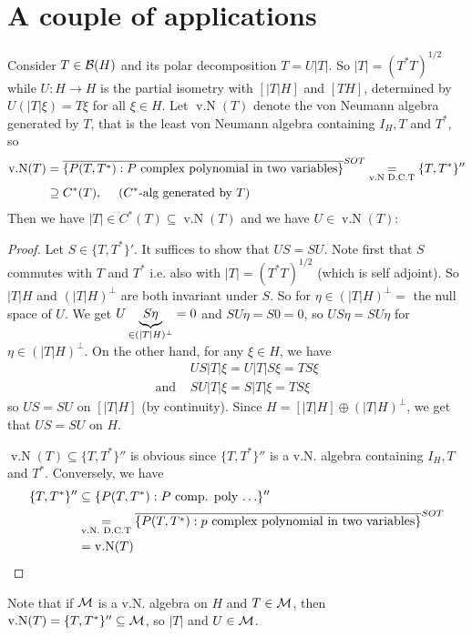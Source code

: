 \documentclass[10pt,english,a4paper]{article}
\theoremstyle{definition}
\let\emph\relax %
\DeclareMathOperator{\vN}{v.N}
\begin{document}
\section{A couple of applications}
Consider $T \in \mathcal{B}(H)$ and its polar decomposition $T = U|T|$. So 
$|T| = (T^*T)^{1/2}$ while $U\colon H\to H$ is the partial isometry 
with \emph{initial space} $[|T|H]$ and \emph{final space} $[TH]$, determined
by $U(|T|\xi) = T\xi$ for all $\xi \in H$.
Let $\vN(T)$ denote the von Neumann algebra generated by $T$, 
that is the least von Neumann algebra containing $I_H, T$ and $T^*$,
so 
\begin{align*}
 \vN(T) &= \ol{\{P(T,T^*): P \text{ complex polynomial in two variables}\}}^{SOT} 
\underset{\text{v.N D.C.T}}{=} \{T,T^*\}''  \\
&\supseteq C^*(T),\quad \text{ ($C^*$-alg generated by $T$)}
\end{align*}
Then we have $|T| \in C^*(T)\subseteq \vN(T)$ 
and we have $U \in \vN(T)$:
\begin{proof}
    Let $S \in \{T,T^*\}'$. It suffices to show that $US=SU$.
Note first that $S$ commutes with $T$ and $T^*$ i.e. also with 
$|T| = (T^*T)^{1/2}$ (which is self adjoint).
So $|T|H$ and $(|T|H)^{\perp}$ are both invariant 
under $S$. So for $\eta \in (|T|H)^{\perp}=$ the null space of $U$.
We get $U\underbrace{S\eta}_{\in(|T|H)^{\perp}} = 0$ and 
$SU\eta = S0 = 0$, so $US\eta = SU\eta$ for $\eta \in (|T|H)^{\perp}$.
On the other hand, for any $\xi \in H$, we have 
\begin{align*}
&US|T|\xi = U|T|S\xi = TS\xi \\
\text{and }&     
SU|T|\xi = S|T|\xi = TS\xi 
\end{align*}
so $US=SU$ on $[|T|H]$ (by continuity). 
Since $H = [|T|H] \oplus (|T|H)^{\perp}$, we get that 
$US=SU$ on $H$.

$\vN(T)\subseteq \{T,T^*\}''$ is obvious since
$\{T,T^*\}''$ is a v.N. algebra containing $I_H, T$ and $T^*$.
Conversely, we have
\begin{align*}
\{T,T^*\}'' &\subseteq \{ P(T,T^*) : P\text{ comp. poly $\ldots$}\}'' \\
&\underset{\text{v.N. D.C.T}}{=}  
\ol{\{P(T,T^*): p \text{ complex polynomial in two variables}\}}^{SOT} \\
&= \vN(T)
\end{align*}
\end{proof}

Note that if $\mathcal{M}$ is a v.N. algebra on $H$ and $T \in \mathcal{M}$, then 
$\vN(T) = \{T,T^*\}'' \subseteq \Ms$, so $|T|$ and $U \in \mathcal{M}$. 
\end{document}
